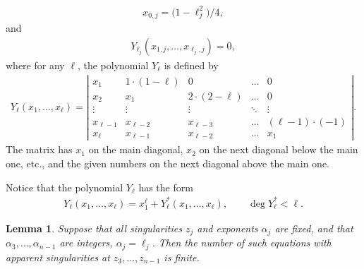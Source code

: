\documentclass[pdftex]{sigma}
\numberwithin{equation}{section}
\newtheorem{lem}[thm]{Lemma}
 { \theoremstyle{definition}
\newtheorem{Remark}[thm]{Remark} }
\def\lc{,\allowbreak\ldots,\allowbreak}
\begin{document}
\begin{gather*}
x_{0,j}=\big(1-\ell_j^2\big)/4,
\end{gather*}
and
\begin{gather}\label{app}
Y_{\ell_j}(x_{1,j}\lc x_{\ell_j,j})=0,
\end{gather}
where for any $\ell$, the polynomial $Y_\ell$ is defined by
\begin{gather*}
Y_{\ell}(x_1\lc x_\ell)=
\left|\begin{matrix}x_1&1\cdot(1-\ell)&0&\ldots&0\\
x_2&x_1&2\cdot(2-\ell)&\ldots&0\\
\vdots&\vdots&\vdots&\ddots&\vdots\\
x_{\ell-1}&x_{\ell-2}&x_{\ell-3}&\ldots&(\ell-1)\cdot(-1)\\
x_\ell&x_{\ell-1}&x_{\ell-2}&\ldots&x_1
\end{matrix}\right|.
\end{gather*}
The matrix has $x_1$ on the main diagonal, $x_2$ on the next diagonal below the main one, etc., and the given numbers on the next diagonal above the main one.

Notice that the polynomial $Y_{\ell}$ has the form
\begin{gather}\label{app2}
Y_\ell(x_1\lc x_\ell)=x_1^\ell+Y^*_\ell(x_1\lc x_\ell),\qquad \deg Y^*_\ell< \ell.
\end{gather}
\begin{lem}\label{lem1}
Suppose that all singularities $z_j$ and exponents $\alpha_j$ are fixed, and that $\alpha_3\lc\alpha_{n-1}$ are integers, $\alpha_j=\ell_j$. Then the number of such equations with apparent singularities at $z_3\lc z_{n-1}$ is finite.
\end{lem}
\end{document}
